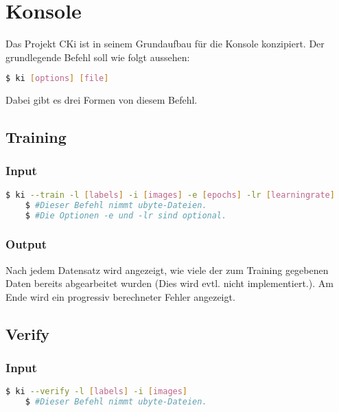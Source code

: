 \section{Konsole}
\label{sec:DesignKonsole}
Das Projekt CKi ist in seinem Grundaufbau für die Konsole konzipiert. Der grundlegende Befehl soll wie folgt aussehen: 
\begin{lstlisting}[language=bash]
	$ ki [options] [file]
\end{lstlisting}
Dabei gibt es drei Formen von diesem Befehl.

\subsection{Training}
\label{sec:DesignTraining}
\subsubsection{Input}
\label{sec:DesignTraiInput}
\begin{lstlisting}[language=bash]
	$ ki --train -l [labels] -i [images] -e [epochs] -lr [learningrate]
	$ #Dieser Befehl nimmt ubyte-Dateien.
	$ #Die Optionen -e und -lr sind optional.
\end{lstlisting}

\subsubsection{Output}
\label{sec:TraiOutput}
Nach jedem Datensatz wird angezeigt, wie viele der zum Training gegebenen Daten bereits abgearbeitet wurden (Dies wird evtl. nicht implementiert.). Am Ende wird ein progressiv berechneter Fehler angezeigt.

\subsection{Verify}
\label{sec:DesignTest}
\subsubsection{Input}
\label{sec:DesignTestInput}
\begin{lstlisting}[language=bash]
	$ ki --verify -l [labels] -i [images]
	$ #Dieser Befehl nimmt ubyte-Dateien.
\end{lstlisting}

